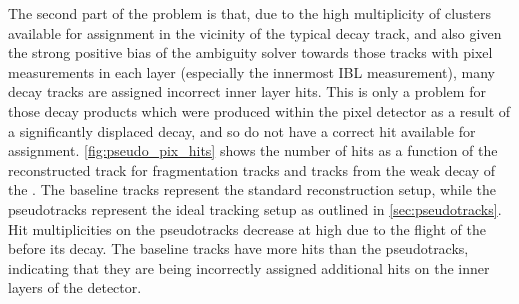 The second part of the problem is that, due to the high multiplicity of clusters available for assignment in the vicinity of the typical \highpt \bhadron decay track, and also given the strong positive bias of the ambiguity solver towards those tracks with pixel measurements in each layer (especially the innermost IBL measurement), many \bhadron decay tracks are assigned incorrect inner layer hits.
This is only a problem for those decay products which were produced within the pixel detector as a result of a significantly displaced \bhadron decay, and so do not have a correct hit available for assignment.
\cref{fig:pseudo_pix_hits} shows the number of hits as a function of the reconstructed track \pt for fragmentation tracks and tracks from the weak decay of the \bhadron.
The baseline tracks represent the standard reconstruction setup, while the pseudotracks represent the ideal tracking setup as outlined in \cref{sec:pseudotracks}.
Hit multiplicities on the pseudotracks decrease at high \pt due to the flight of the \bhadron before its decay. 
The baseline tracks have more hits than the pseudotracks, indicating that they are being incorrectly assigned additional hits on the inner layers of the detector.


